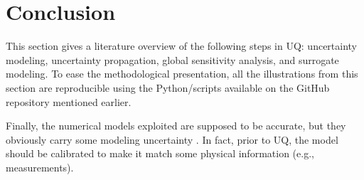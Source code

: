\section{Conclusion}

This section gives a literature overview of the following steps in UQ: uncertainty modeling, uncertainty propagation, global sensitivity analysis, and surrogate modeling. 
To ease the methodological presentation, all the illustrations from this section are reproducible using the Python/\ot scripts available on the GitHub repository mentioned earlier. 

Finally, the numerical models exploited are supposed to be accurate, but they obviously carry some modeling uncertainty \citep{oberkampf_2010_VVUQ}. 
In fact, prior to UQ, the model should be calibrated \citep{ghanem_2017} to make it match some physical information (e.g., measurements). 
